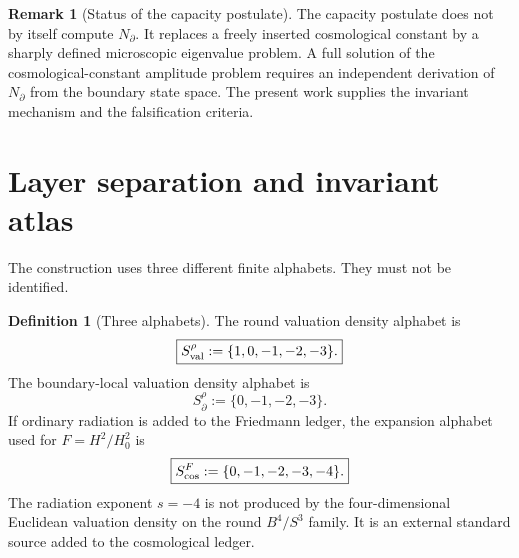 \documentclass[aps,prd,reprint,nofootinbib,superscriptaddress,floatfix]{revtex4-2}
\numberwithin{equation}{section}
\theoremstyle{definition}
\newtheorem{definition}{Definition}[section]
\newtheorem{remark}{Remark}[section]
\theoremstyle{plain}
\newcommand{\Ncap}{N_{\partial}}
\begin{document}
\begin{remark}[Status of the capacity postulate]
The capacity postulate does not by itself compute \(\Ncap\).  It replaces a freely inserted cosmological constant by a sharply defined microscopic eigenvalue problem.  A full solution of the cosmological-constant amplitude problem requires an independent derivation of \(\Ncap\) from the boundary state space.  The present work supplies the invariant mechanism and the falsification criteria.
\end{remark}

\section{Layer separation and invariant atlas}\label{sec:atlas}

The construction uses three different finite alphabets.  They must not be identified.

\begin{definition}[Three alphabets]
The round valuation density alphabet is
\begin{equation}
\boxed{
S_{\rm val}^{\rho}:=\{1,0,-1,-2,-3\}.
}
\end{equation}
The boundary-local valuation density alphabet is
\begin{equation}
\boxed{
S_{\partial}^{\rho}:=\{0,-1,-2,-3\}.
}
\end{equation}
If ordinary radiation is added to the Friedmann ledger, the expansion alphabet used for \(F=H^2/H_0^2\) is
\begin{equation}
\boxed{
S_{\rm cos}^{F}:=\{0,-1,-2,-3,-4\}.
}
\end{equation}
The radiation exponent \(s=-4\) is not produced by the four-dimensional Euclidean valuation density on the round \(B^4/S^3\) family.  It is an external standard source added to the cosmological ledger.
\end{definition}
\end{document}
